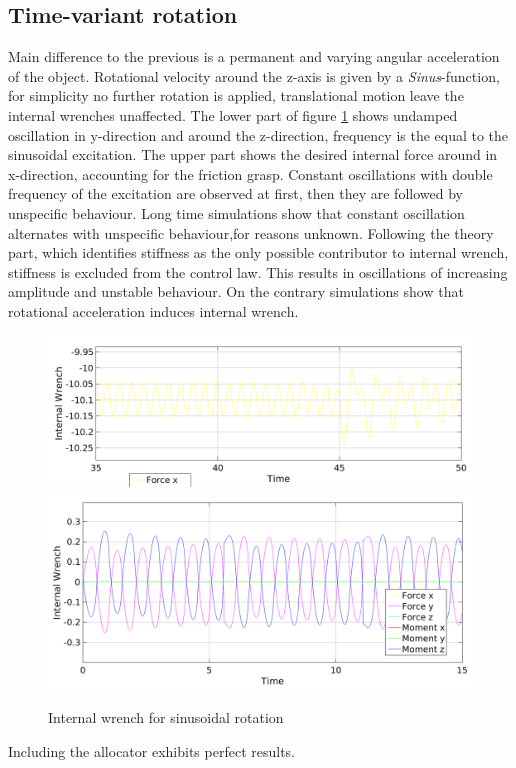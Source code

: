 \documentclass[conference]{IEEEtran}
\begin{document}
\subsection{Time-variant rotation} 
Main difference to the previous is a permanent and varying angular acceleration of the object. Rotational velocity around the z-axis is given by a \textit{Sinus}-function, for simplicity no further rotation is applied, translational motion leave the internal wrenches unaffected. The lower part of figure \ref{IntForceSinus} shows undamped oscillation in y-direction and around the z-direction, frequency is the equal to the sinusoidal excitation. The upper part shows the desired internal force around in x-direction, accounting for the friction grasp. Constant oscillations with double frequency of the excitation are observed at first, then they are followed by unspecific behaviour. Long time simulations show that constant oscillation alternates with unspecific behaviour,for reasons unknown. Following the theory part, which identifies stiffness as the only possible contributor to internal wrench, stiffness is excluded from the control law. This results in oscillations of increasing amplitude and unstable behaviour. On the contrary simulations show that rotational acceleration induces internal wrench.  
\begin{figure}
\includegraphics[width=\linewidth]{IntForceSinus2}
\includegraphics[width=\linewidth]{IntForceSinus1}
\caption{Internal wrench for sinusoidal rotation}
\label{IntForceSinus}
\end{figure} 
Including the allocator exhibits perfect results.
\end{document}
